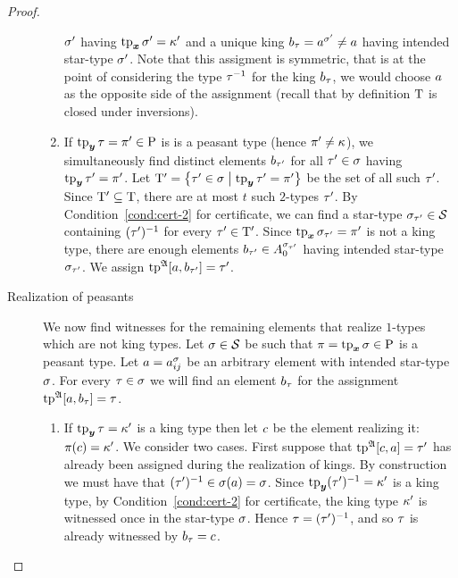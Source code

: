 \begin{proof}
\begin{description}
\begin{enumerate}
  $\sigma'$ having $\operatorname{tp}_{\bm{x}}\sigma' = \kappa'$ and a unique king $b_\tau =
  a^{\sigma'} \neq a$ having intended star-type $\sigma'$. Note that this
  assigment is symmetric, that is at the point of considering the type
  $\tau^{-1}$ for the king $b_\tau$, we would choose $a$ as the
  opposite side of the assignment (recall that by definition $\mathrm{T}$ is closed
  under inversions).
  \item If $\operatorname{tp}_{\bm{y}}\tau = {\pi'} \in \mathrm{P}$ is is a peasant type (hence
  ${\pi'} \neq \kappa$), we simultaneously find distinct elements $b_{\tau'}$
  for all ${\tau'} \in \sigma$ having $\operatorname{tp}_{\bm{y}}{\tau'} = {\pi'}$.
  Let ${\mathrm{T}'} = \left\{{\tau'} \in \sigma\mathrel{}\middle|\mathrel{}\operatorname{tp}_{\bm{y}}{\tau'} = {\pi'}\right\}$ be the set of
  all such ${\tau'}$.
  Since ${\mathrm{T}'} \subseteq \mathrm{T}$, there are
  at most $t$ such $2$-types ${\tau'}$. By Condition~\ref{cond:cert-2} for
  certificate, we can find a star-type $\sigma_{{\tau'}} \in \mathcal{S}$ containing
  $({\tau'})^{-1}$ for every ${\tau'} \in {\mathrm{T}'}$. Since $\operatorname{tp}_{\bm{x}}\sigma_{{\tau'}} =
  {\pi'}$ is not a king type, there are enough elements 
  $b_{{\tau'}} \in A_0^{\sigma_{{\tau'}}}$ having intended star-type
  $\sigma_{{\tau'}}$.
  We assign $\operatorname{tp}^{\mathfrak{A}}[a,b_{\tau'}] = {\tau'}$.
  \end{enumerate}
  \item[Realization of peasants] We now find witnesses for the remaining
  elements that realize $1$-types which are not king types. Let $\sigma \in \mathcal{S}$ be such that $\pi =
  \operatorname{tp}_{\bm{x}}\sigma \in \mathrm{P}$ is a peasant type. Let $a = a_{ij}^\sigma$ be an arbitrary
  element with intended star-type $\sigma$. For every $\tau \in \sigma$ we will find an
  element $b_\tau$ for the assignment $\operatorname{tp}^{\mathfrak{A}}[a,b_\tau] = \tau$.
  \begin{enumerate}
    \item If $\operatorname{tp}_{\bm{y}}\tau = {\kappa'}$ is a king type then let $c$ be the element
    realizing it: $\pi(c) = {\kappa'}$.
    We consider two cases.
    First suppose that $\operatorname{tp}^{\mathfrak{A}}[c,a] = {\tau'}$ has already been assigned
    during the realization of kings.
    By construction we must have that $({\tau'})^{-1} \in \sigma(a) = \sigma$.
    Since $\operatorname{tp}_{\bm{y}}({\tau'})^{-1} = {\kappa'}$ is a king type,
    by Condition~\ref{cond:cert-2}
    for certificate, the king type ${\kappa'}$ is witnessed once in the star-type
    $\sigma$. Hence $\tau = (\tau')^{-1}$, and so $\tau$ is already witnessed
    by $b_\tau = c$.
    

\end{enumerate}
\end{description}
\end{proof}
